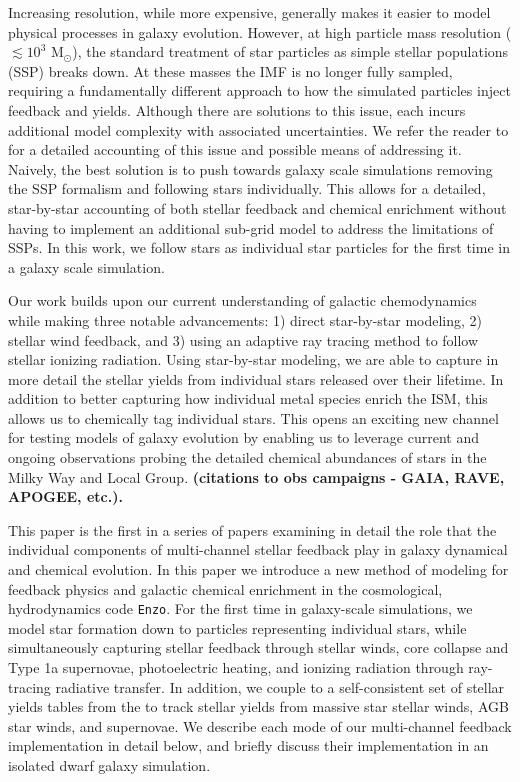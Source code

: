 \documentclass[twocolumn]{aastex61}
\begin{document}
Increasing resolution, while more expensive, generally makes it easier to model physical processes in galaxy evolution. However, at high particle mass resolution ($\lesssim 10^3$ M$_{\odot}$), the standard treatment of star particles as simple stellar populations (SSP) breaks down. At these masses the IMF is no longer fully sampled, requiring a fundamentally different approach to how the simulated particles inject feedback and yields. Although there are solutions to this issue, each incurs additional model complexity with associated uncertainties. We refer the reader to \cite{Revaz2016} for a detailed accounting of this issue and possible means of addressing it. Naively, the best solution is to push towards galaxy scale simulations removing the SSP formalism and following stars individually. This allows for a detailed, star-by-star accounting of both stellar feedback and chemical enrichment without having to implement an additional sub-grid model to address the limitations of SSPs. In this work, we follow stars as individual star particles for the first time in a galaxy scale simulation.

Our work builds upon our current understanding of galactic chemodynamics while making three notable advancements: 1) direct star-by-star modeling, 2) stellar wind feedback, and 3) using an adaptive ray tracing method to follow stellar ionizing radiation. Using star-by-star modeling, we are able to capture in more detail the stellar yields from individual stars released over their lifetime. In addition to better capturing how individual metal species enrich the ISM, this allows us to chemically tag individual stars. This opens an exciting new channel for testing models of galaxy evolution by enabling us to leverage current and ongoing observations probing the detailed chemical abundances of stars in the Milky Way and Local Group. \textbf{(citations to obs campaigns - GAIA, RAVE, APOGEE, etc.).}

This paper is the first in a series of papers examining in detail the role that the individual components of multi-channel stellar feedback play in galaxy dynamical and chemical evolution. In this paper we introduce a new method of modeling for feedback physics and galactic chemical enrichment in the cosmological, hydrodynamics code \texttt{Enzo}. For the first time in galaxy-scale simulations, we model star formation down to particles representing individual stars, while simultaneously capturing stellar feedback through stellar winds, core collapse and Type 1a supernovae, photoelectric heating, and ionizing radiation through ray-tracing radiative transfer. In addition, we couple to a self-consistent set of stellar yields tables from the to track stellar yields from massive star stellar winds, AGB star winds, and supernovae. We describe each mode of our multi-channel feedback implementation in detail below, and briefly discuss their implementation in an isolated dwarf galaxy simulation.
\end{document}
